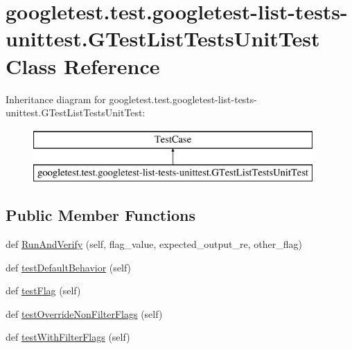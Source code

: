 \hypertarget{classgoogletest_1_1test_1_1googletest-list-tests-unittest_1_1_g_test_list_tests_unit_test}{}\section{googletest.\+test.\+googletest-\/list-\/tests-\/unittest.G\+Test\+List\+Tests\+Unit\+Test Class Reference}
\label{classgoogletest_1_1test_1_1googletest-list-tests-unittest_1_1_g_test_list_tests_unit_test}
Inheritance diagram for googletest.\+test.\+googletest-\/list-\/tests-\/unittest.G\+Test\+List\+Tests\+Unit\+Test\+:\begin{figure}[H]
\begin{center}
\leavevmode
\includegraphics[height=2.000000cm]{d6/dd1/classgoogletest_1_1test_1_1googletest-list-tests-unittest_1_1_g_test_list_tests_unit_test}
\end{center}
\end{figure}
\subsection*{Public Member Functions}
\begin{DoxyCompactItemize}
\item 
def \mbox{\hyperlink{classgoogletest_1_1test_1_1googletest-list-tests-unittest_1_1_g_test_list_tests_unit_test_aa6069a59783d3dcff3d367f736ce833e}{Run\+And\+Verify}} (self, flag\+\_\+value, expected\+\_\+output\+\_\+re, other\+\_\+flag)
\item 
def \mbox{\hyperlink{classgoogletest_1_1test_1_1googletest-list-tests-unittest_1_1_g_test_list_tests_unit_test_af8df8855ac2cbb1d35d466188924cb9a}{test\+Default\+Behavior}} (self)
\item 
def \mbox{\hyperlink{classgoogletest_1_1test_1_1googletest-list-tests-unittest_1_1_g_test_list_tests_unit_test_a43f835db693ac58569ba28fb0d951639}{test\+Flag}} (self)
\item 
def \mbox{\hyperlink{classgoogletest_1_1test_1_1googletest-list-tests-unittest_1_1_g_test_list_tests_unit_test_adfd86b6e1f312f97e973b35b1c823b22}{test\+Override\+Non\+Filter\+Flags}} (self)
\item 
def \mbox{\hyperlink{classgoogletest_1_1test_1_1googletest-list-tests-unittest_1_1_g_test_list_tests_unit_test_a0811642d1ba2d748f0f056190683c6ae}{test\+With\+Filter\+Flags}} (self)
\end{DoxyCompactItemize}


